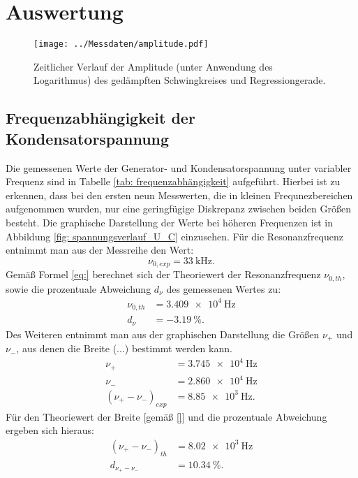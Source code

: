 \section{Auswertung}




\begin{figure}
  \centering
  \texttt{[image: ../Messdaten/amplitude.pdf]}
  \caption{Zeitlicher Verlauf der Amplitude (unter Anwendung des Logarithmus) des gedämpften Schwingkreises und Regressiongerade.}
  \label{fig: amplitude}
\end{figure}

\subsection{Frequenzabhängigkeit der Kondensatorspannung}
Die gemessenen Werte der Generator- und Kondensatorspannung unter variabler Frequenz sind in Tabelle \ref{tab: frequenzabhängigkeit} aufgeführt.
Hierbei ist zu erkennen, dass bei den ersten neun Messwerten, die in kleinen Frequnezbereichen aufgenommen wurden, nur eine geringfügige
Diskrepanz zwischen beiden Größen besteht. Die graphische Darstellung der Werte bei höheren Frequenzen ist in Abbildung \ref{fig: spannungsverlauf_U_C}
einzusehen. Für die Resonanzfrequenz entnimmt man aus der Messreihe den Wert:
\begin{equation}
  \nu_{0, exp} = \SI{33}{\kilo\hertz}.
  \label{eq: exp_resonanzfrequenz}
\end{equation}
Gemäß Formel \eqref{eq:} berechnet sich der Theoriewert der Resonanzfrequenz $\nu_{0, th}$, sowie die prozentuale Abweichung $d_{\nu}$ des gemessenen Wertes zu:
\begin{align}
  \nu_{0, th} &= \SI{3.409e4}{\hertz} \\
  d_{\nu} &= \SI{-3.19}{\percent}.
\label{eq: theo_resonanzfrequenz}
\end{align}
Des Weiteren entnimmt man aus der graphischen Darstellung die Größen $\nu_+$ und $\nu_-$, aus denen die Breite (...) bestimmt werden kann.
\begin{align}
  \nu_{+} &= \SI{3.745e4}{\hertz} \\
  \nu_{-} &= \SI{2.860e4}{\hertz} \\
  (\nu_{+}-\nu_{-})_{exp} &= \SI{8.85e3}{\hertz}.
\label{eq: breite_exp}
\end{align}
Für den Theoriewert der Breite [gemäß \eqref{}] und die prozentuale Abweichung ergeben sich hieraus:
\begin{align}
  (\nu_{+}-\nu_{-})_{th} &= \SI{8.02e3}{\hertz}\\
  d_{\nu_{+}-\nu_{-}} &= \SI{10.34}{\percent}.
\label{eq: theo_breite}
\end{align}

